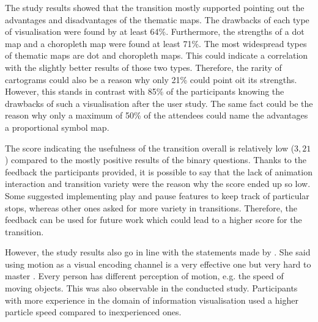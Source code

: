 The study results showed that the transition mostly supported pointing out the advantages and disadvantages of the thematic maps. The drawbacks of each type of visualisation were found by at least 64\%. Furthermore, the strengths of a dot map and a choropleth map were found at least 71\%.
The most widespread types of thematic maps are dot and choropleth maps. This could indicate a correlation with the slightly better results of those two types.
Therefore, the rarity of cartograms could also be a reason why only 21\% could point oit its strengths. However, this stands in contrast with 85\% of the participants knowing the drawbacks of such a visualisation after the user study.
The same fact could be the reason  why only a maximum of 50\% of the attendees could name the advantages a proportional symbol map.

The score indicating the usefulness of the transition overall is relatively low ($3,21$) compared to the mostly positive results of the binary questions. Thanks to the feedback the participants provided, it is possible to say that the lack of animation interaction and transition variety were the reason why the score ended up so low. Some suggested implementing play and pause features to keep track of particular stops, whereas other ones asked for more variety in transitions. Therefore, the feedback can be used for future work which could lead to a higher score for the transition.

However, the study results also go in line with the statements made by \citeauthor{Munzner2014}. She said using motion as a visual encoding channel is a very effective one but very hard to master . Every person has different perception of motion, e.g. the speed of moving objects. This was also observable in the conducted study. Participants with more experience in the domain of information visualisation used a higher particle speed compared to inexperienced ones.